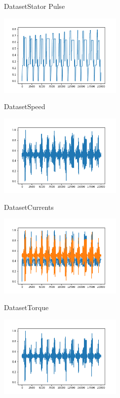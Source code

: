 \documentclass[handout]{beamer}
\begin{document}
\begin{frame}{Dataset}{Stator Pulse}
\begin{center}
  \includegraphics[width=0.8\linewidth, height=4cm]{images/stator_pulse}
\end{center}
\end{frame}

\begin{frame}{Dataset}{Speed}
\begin{center}
  \includegraphics[width=0.8\linewidth, height=4cm]{images/speed}
\end{center}
\end{frame}

\begin{frame}{Dataset}{Currents}
\begin{center}
  \includegraphics[width=0.8\linewidth, height=4cm]{images/current}
\end{center}
\end{frame}

\begin{frame}{Dataset}{Torque}
\begin{center}
  \includegraphics[width=0.8\linewidth, height=4cm]{images/torque}
\end{center}
\end{frame}
\end{document}
